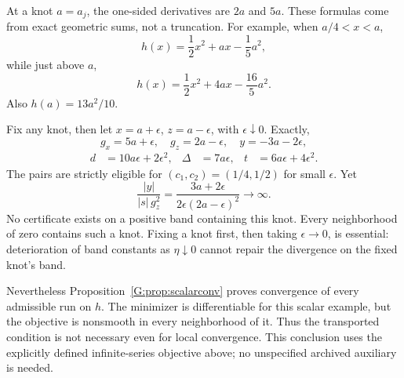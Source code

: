 At a knot $a=a_j$, the one-sided derivatives are $2a$ and $5a$. These formulas come from exact geometric sums, not a truncation. For example, when $a/4<x<a$,
\[
 h(x)=\frac12x^2+ax-\frac15a^2,
\]
while just above $a$,
\[
 h(x)=\frac12x^2+4ax-\frac{16}{5}a^2.
\]
Also $h(a)=13a^2/10$.

Fix any knot, then let $x=a+\epsilon$, $z=a-\epsilon$, with $\epsilon\downarrow0$. Exactly,
\[
 g_x=5a+\epsilon,\quad g_z=2a-\epsilon,\quad y=-3a-2\epsilon,
\]
\begin{align*}
 d&=10a\epsilon+2\epsilon^2,&
 \Delta&=7a\epsilon,&
 t&=6a\epsilon+4\epsilon^2.
\end{align*}
The pairs are strictly eligible for $(c_1,c_2)=(1/4,1/2)$ for small $\epsilon$. Yet
\[
 \frac{|y|}{|s|\,g_z^2}
 =\frac{3a+2\epsilon}{2\epsilon(2a-\epsilon)^2}\longrightarrow\infty.
\]
No certificate exists on a positive band containing this knot. Every neighborhood of zero contains such a knot. Fixing a knot first, then taking $\epsilon\to0$, is essential: deterioration of band constants as $\eta\downarrow0$ cannot repair the divergence on the fixed knot's band.

Nevertheless Proposition~\ref{G:prop:scalarconv} proves convergence of every admissible run on $h$. The minimizer is differentiable for this scalar example, but the objective is nonsmooth in every neighborhood of it. Thus the transported condition is not necessary even for local convergence. This conclusion uses the explicitly defined infinite-series objective above; no unspecified archived auxiliary is needed.


\setcounter{section}{8}
\setcounter{theorem}{0}
\setcounter{equation}{8}


